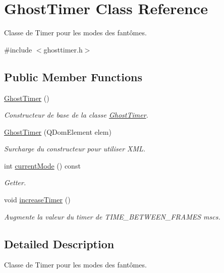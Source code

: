 \hypertarget{class_ghost_timer}{}\section{Ghost\+Timer Class Reference}
\label{class_ghost_timer}


Classe de Timer pour les modes des fantômes.  




{\ttfamily \#include $<$ghosttimer.\+h$>$}

\subsection*{Public Member Functions}
\begin{DoxyCompactItemize}
\item 
\hyperlink{class_ghost_timer_adebf7cf8bb544e23f6fd8ce7095b8394}{Ghost\+Timer} ()
\begin{DoxyCompactList}\small\item\em Constructeur de base de la classe \hyperlink{class_ghost_timer}{Ghost\+Timer}. \end{DoxyCompactList}\item 
\hyperlink{class_ghost_timer_a363147268fa53ea5e7f9e4b50b8453ef}{Ghost\+Timer} (Q\+Dom\+Element elem)
\begin{DoxyCompactList}\small\item\em Surcharge du constructeur pour utiliser X\+M\+L. \end{DoxyCompactList}\item 
int \hyperlink{class_ghost_timer_adf6ae0f333a95d4fe3e6f8a132a8201d}{current\+Mode} () const 
\begin{DoxyCompactList}\small\item\em Getter. \end{DoxyCompactList}\item 
void \hyperlink{class_ghost_timer_acca62ab4734e961d46965a7d10a886ad}{increase\+Timer} ()
\begin{DoxyCompactList}\small\item\em Augmente la valeur du timer de T\+I\+M\+E\+\_\+\+B\+E\+T\+W\+E\+E\+N\+\_\+\+F\+R\+A\+M\+E\+S mscs. \end{DoxyCompactList}\end{DoxyCompactItemize}


\subsection{Detailed Description}
Classe de Timer pour les modes des fantômes. 

